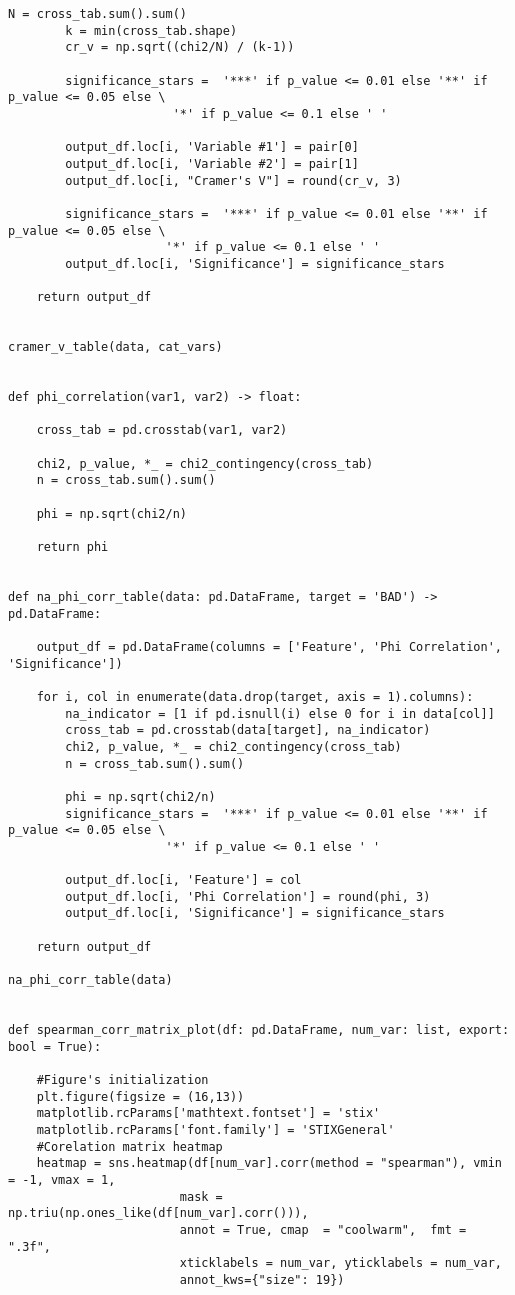 \begin{lstlisting}[basicstyle=\footnotesize\ttfamily]
        N = cross_tab.sum().sum()
        k = min(cross_tab.shape)
        cr_v = np.sqrt((chi2/N) / (k-1))

        significance_stars =  '***' if p_value <= 0.01 else '**' if p_value <= 0.05 else \
		               '*' if p_value <= 0.1 else ' '

        output_df.loc[i, 'Variable #1'] = pair[0]
        output_df.loc[i, 'Variable #2'] = pair[1]
        output_df.loc[i, "Cramer's V"] = round(cr_v, 3)

        significance_stars =  '***' if p_value <= 0.01 else '**' if p_value <= 0.05 else \
		              '*' if p_value <= 0.1 else ' '
        output_df.loc[i, 'Significance'] = significance_stars

    return output_df


cramer_v_table(data, cat_vars)


def phi_correlation(var1, var2) -> float:

    cross_tab = pd.crosstab(var1, var2)

    chi2, p_value, *_ = chi2_contingency(cross_tab)
    n = cross_tab.sum().sum() 

    phi = np.sqrt(chi2/n)
    
    return phi


def na_phi_corr_table(data: pd.DataFrame, target = 'BAD') -> pd.DataFrame:

    output_df = pd.DataFrame(columns = ['Feature', 'Phi Correlation', 'Significance'])

    for i, col in enumerate(data.drop(target, axis = 1).columns):
        na_indicator = [1 if pd.isnull(i) else 0 for i in data[col]]
        cross_tab = pd.crosstab(data[target], na_indicator)
        chi2, p_value, *_ = chi2_contingency(cross_tab)
        n = cross_tab.sum().sum() 

        phi = np.sqrt(chi2/n)
        significance_stars =  '***' if p_value <= 0.01 else '**' if p_value <= 0.05 else \
		              '*' if p_value <= 0.1 else ' '

        output_df.loc[i, 'Feature'] = col
        output_df.loc[i, 'Phi Correlation'] = round(phi, 3)
        output_df.loc[i, 'Significance'] = significance_stars

    return output_df

na_phi_corr_table(data)


def spearman_corr_matrix_plot(df: pd.DataFrame, num_var: list, export: bool = True):
    
    #Figure's initialization
    plt.figure(figsize = (16,13))
    matplotlib.rcParams['mathtext.fontset'] = 'stix'
    matplotlib.rcParams['font.family'] = 'STIXGeneral'
    #Corelation matrix heatmap
    heatmap = sns.heatmap(df[num_var].corr(method = "spearman"), vmin = -1, vmax = 1,
                        mask = np.triu(np.ones_like(df[num_var].corr())),
                        annot = True, cmap  = "coolwarm",  fmt = ".3f",
                        xticklabels = num_var, yticklabels = num_var,
                        annot_kws={"size": 19})


\end{lstlisting}
